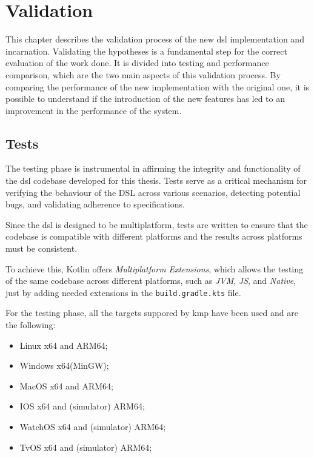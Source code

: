 
\chapter{Validation}
\label{ch:validation}
This chapter describes the validation process of the new \ac{dsl} implementation and incarnation.
Validating the hypotheses is a fundamental step for the correct evaluation of the work done.
It is divided into testing and performance comparison, which are the two main aspects of this validation process.
By comparing the performance of the new implementation with the original one, it is possible to understand if the
introduction of the new features has led to an improvement in the performance of the system.

\section{Tests}
\label{sec:tests}
The testing phase is instrumental in affirming the integrity and functionality of the \ac{dsl} codebase developed for this thesis.
Tests serve as a critical mechanism for verifying the behaviour of the DSL across various scenarios, detecting potential bugs,
and validating adherence to specifications.

Since the \ac{dsl} is designed to be multiplatform, tests are written to ensure that the codebase is compatible with
different platforms and the results across platforms must be consistent.

To achieve this, Kotlin offers \emph{Multiplatform Extensions}, which allows the testing of the same codebase across
different platforms, such as \emph{JVM}, \emph{JS}, and \emph{Native}, just by adding needed extensions in the \texttt{build.gradle.kts} file.

For the testing phase, all the targets suppored by \ac{kmp} have been used and are the following:
\begin{itemize}
    \item Linux x64 and ARM64;
    \item Windows x64(MinGW);
    \item MacOS x64 and ARM64;
    \item IOS x64 and (simulator) ARM64;
    \item WatchOS x64 and (simulator) ARM64;
    \item TvOS x64 and (simulator) ARM64;
\end{itemize}

